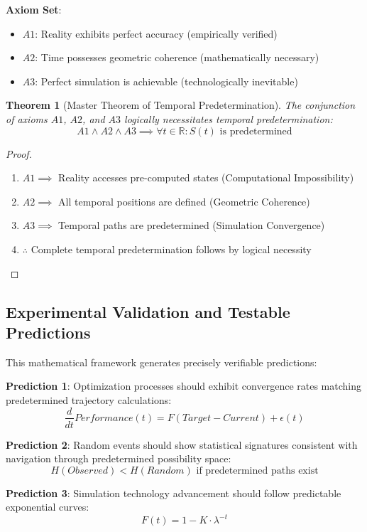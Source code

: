 \documentclass[11pt]{article}
\newtheorem{theorem}{Theorem}[section]
\theoremstyle{remark}
\begin{document}
\textbf{Axiom Set}:
\begin{itemize}
\item $A1$: Reality exhibits perfect accuracy (empirically verified)
\item $A2$: Time possesses geometric coherence (mathematically necessary)
\item $A3$: Perfect simulation is achievable (technologically inevitable)
\end{itemize}

\begin{theorem}[Master Theorem of Temporal Predetermination]
The conjunction of axioms $A1$, $A2$, and $A3$ logically necessitates temporal predetermination:
$$A1 \land A2 \land A3 \implies \forall t \in \mathbb{R}: S(t) \text{ is predetermined}$$
\end{theorem}

\begin{proof}
\begin{enumerate}
\item $A1 \implies$ Reality accesses pre-computed states (Computational Impossibility)
\item $A2 \implies$ All temporal positions are defined (Geometric Coherence)
\item $A3 \implies$ Temporal paths are predetermined (Simulation Convergence)
\item $\therefore$ Complete temporal predetermination follows by logical necessity
\end{enumerate}
\end{proof}

\subsection{Experimental Validation and Testable Predictions}

This mathematical framework generates precisely verifiable predictions:

\textbf{Prediction 1}: Optimization processes should exhibit convergence rates matching predetermined trajectory calculations:
$$\frac{d}{dt}Performance(t) = F(Target - Current) + \epsilon(t)$$

\textbf{Prediction 2}: Random events should show statistical signatures consistent with navigation through predetermined possibility space:
$$H(Observed) < H(Random) \text{ if predetermined paths exist}$$

\textbf{Prediction 3}: Simulation technology advancement should follow predictable exponential curves:
$$F(t) = 1 - K \cdot \lambda^{-t}$$
\end{document}
